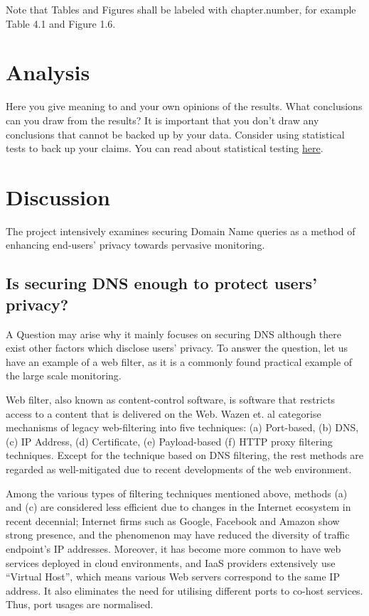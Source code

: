 \documentclass[a4paper,12pt]{article}
\begin{document}
Note that Tables and Figures shall be labeled with chapter.number, for example Table 4.1 and Figure 1.6.

\newpage
	
\section{Analysis}
Here you give meaning to and your own opinions of the results. What conclusions can you draw from the results? It is important that you don't draw any conclusions that cannot be backed up by your data. Consider using statistical tests to back up your claims. You can read about statistical testing \href{https://coursepress.lnu.se/subject/thesis-projects/statistical-testing/}{here}. 
	
\newpage
	
\section{Discussion}
The project intensively examines securing Domain Name queries as a method of enhancing end-users' privacy towards pervasive monitoring.
\subsection{Is securing DNS enough to protect users' privacy?}
A Question may arise why it mainly focuses on securing DNS although there exist other factors which disclose users' privacy.
To answer the question, let us have an example of a web filter, as it is a commonly found practical example of the large scale monitoring\cite{murdoch2008tools}.

Web filter, also known as content-control software, is software that restricts access to a content that is delivered on the Web.
Wazen et. al categorise mechanisms of legacy web-filtering into five techniques: (a) Port-based, (b) DNS, (c) IP Address, (d) Certificate, (e) Payload-based (f) HTTP proxy filtering techniques\cite{shbair2015efficiently}.
Except for the technique based on DNS filtering, the rest methods are regarded as well-mitigated due to recent developments of the web environment. 

Among the various types of filtering techniques mentioned above, methods (a) and (c) are considered less efficient due to changes in the Internet ecosystem in recent decennial;
Internet firms such as Google, Facebook and Amazon show strong presence\cite{haucap2014google}, and the phenomenon may have reduced the diversity of traffic endpoint's IP addresses.
Moreover, it has become more common to have web services deployed in cloud environments\cite{clouds2018stat}, and IaaS providers extensively use ``Virtual Host\cite{virtual24host}'', which means various Web servers correspond to the same IP address.
It also eliminates the need for utilising different ports to co-host services. Thus, port usages are normalised.
\end{document}
